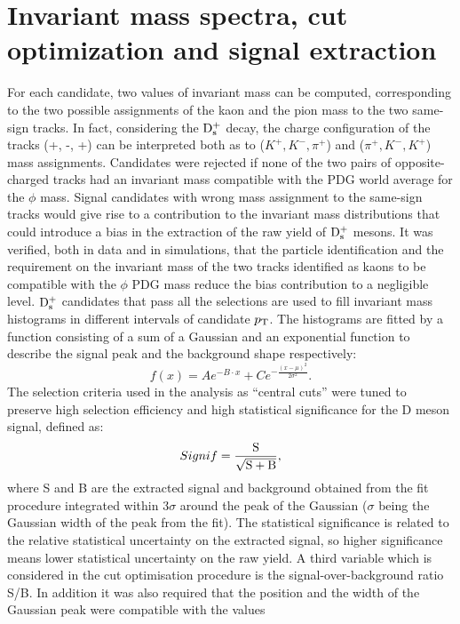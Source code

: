 \section{Invariant mass spectra, cut optimization and signal extraction}
\label{sec:invMassPlotsPP}
For each candidate, two values of invariant mass can be computed, 
corresponding to the two possible assignments of the kaon and the 
pion mass to the two same-sign tracks. In fact, considering the ${\rm D_s^+}$
 decay, the charge configuration of the tracks (+, -, +) can be interpreted
  both as to ($K^+,K^-,\pi^+$) and ($\pi^+,K^-,K^+$) mass assignments. 
     Candidates were rejected if none of the two pairs of opposite-charged 
   tracks had an invariant mass compatible with the PDG world average for the $\phi$ mass.
Signal candidates with 
  wrong mass assignment to the same-sign tracks would give rise to 
  a contribution to the invariant mass distributions that could introduce
   a bias in the extraction of the raw yield of ${\rm D_s^+}$ mesons.
   It was verified, both in data and in simulations, that the particle identification and the requirement 
   on the invariant mass of the two tracks identified as kaons to be compatible with the
$\phi$ PDG mass reduce the bias contribution to a negligible level.
${\rm D_s^+}$ candidates that pass all the selections are 
used to fill invariant mass histograms in different intervals of candidate $p_{\rm T}$.
The histograms are fitted by a function consisting of a sum of 
a Gaussian and an exponential function to describe the signal peak and 
the background shape respectively:
\begin{equation}
f(x)= Ae^{-B\cdot x}+Ce^{-\frac{(x-\mu)^2}{2\sigma^2}}.
\end{equation}
The selection criteria used in the analysis as  ``central cuts'' were tuned to 
preserve high selection efficiency and high statistical 
 significance for the D meson signal, defined as:
\[
Signif = \frac{\rm S}{\sqrt{\rm S+B}},
\]
where S and B are the extracted signal and background obtained 
from the fit procedure integrated within 3$\sigma$ 
around the peak of the Gaussian ($\sigma$ being the
Gaussian width of the peak from the fit). The statistical significance is related to the 
relative statistical uncertainty on the extracted signal, so higher 
significance means lower statistical uncertainty on the raw yield. 
A third variable which is considered in the cut optimisation procedure
 is the signal-over-background ratio S/B. In addition it was also
required that the position and the width 
  of the Gaussian peak were compatible with the values
